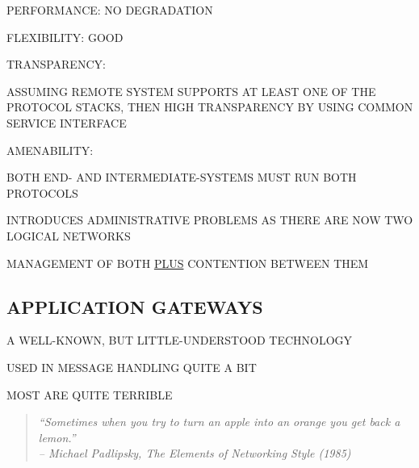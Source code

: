

\begin{bwslide}

\begin{nrtc}
\item	PERFORMANCE: NO DEGRADATION

\item	FLEXIBILITY: GOOD

\item	TRANSPARENCY:
    \begin{nrtc}
    \item	ASSUMING REMOTE SYSTEM SUPPORTS AT LEAST ONE OF THE PROTOCOL
		STACKS, THEN HIGH TRANSPARENCY BY USING COMMON SERVICE
		INTERFACE
    \end{nrtc}

\item	AMENABILITY:
    \begin{nrtc}
    \item	BOTH END- AND INTERMEDIATE-SYSTEMS MUST RUN BOTH PROTOCOLS

    \item	INTRODUCES ADMINISTRATIVE PROBLEMS AS THERE ARE NOW TWO
		LOGICAL NETWORKS
	\begin{nrtc}
	\item	MANAGEMENT OF BOTH \underline{PLUS} CONTENTION BETWEEN THEM
	\end{nrtc}
    \end{nrtc}
\end{nrtc}
\end{bwslide}


\begin{bwslide}
\part*	{APPLICATION GATEWAYS}\bf

\begin{nrtc}
\item	A WELL-KNOWN, BUT LITTLE-UNDERSTOOD TECHNOLOGY
    \begin{nrtc}
    \item	USED IN MESSAGE HANDLING QUITE A BIT
    \end{nrtc}

\item	MOST ARE QUITE TERRIBLE
\begin{quote}\em
``Sometimes when you try to turn an apple into an orange you get back a
lemon.''\\ \raggedleft
-- Michael Padlipsky, The Elements of Networking Style (1985)
\end{quote}
\end{nrtc}
\end{bwslide}


